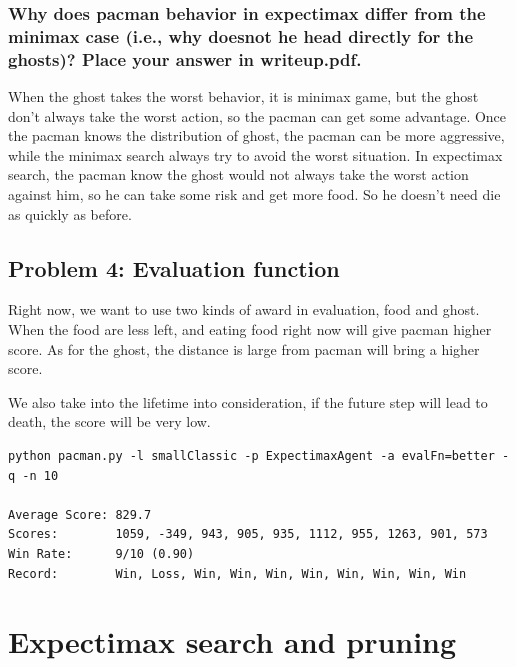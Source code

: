 \documentclass[12pt]{article}
\begin{document}
\subsubsection{Why does pacman  behavior in expectimax differ from the minimax case (i.e., why doesnot he head directly for the ghosts)? Place your answer in writeup.pdf.}
When the ghost takes the worst behavior, it is minimax game, but the ghost don't always take the worst action, so the pacman can get some advantage. Once the pacman knows the distribution of ghost, the pacman can be more aggressive, while the minimax search always try to avoid the worst situation. 
In expectimax search, the pacman know the ghost would not always take the worst action against him, so he can take some risk and get more food. So he doesn't need die as quickly as before.



\subsection{Problem 4: Evaluation function}




Right now, we want to use two kinds of award in evaluation, food and ghost. When the food are less left, and eating food right now will give pacman higher score. As for the ghost, the distance is large from pacman will bring a higher score.

We also take into the lifetime into consideration, if the future step will lead to death, the score will be very low. 

\begin{lstlisting}
python pacman.py -l smallClassic -p ExpectimaxAgent -a evalFn=better -q -n 10

Average Score: 829.7
Scores:        1059, -349, 943, 905, 935, 1112, 955, 1263, 901, 573
Win Rate:      9/10 (0.90)
Record:        Win, Loss, Win, Win, Win, Win, Win, Win, Win, Win
\end{lstlisting}





\section{Expectimax search and pruning}
	\subsection{}
		\paragraph{}
\end{document}
